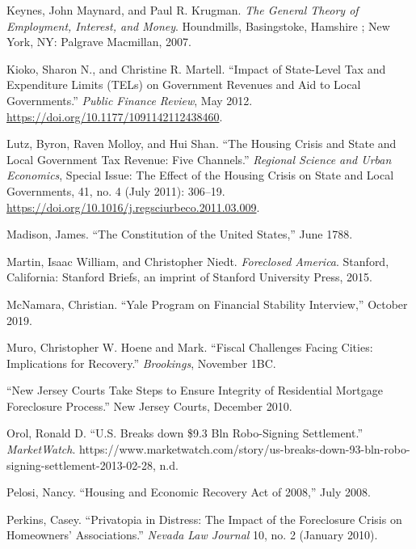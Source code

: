 \documentclass[
]{article}
\begin{document}
\leavevmode\hypertarget{ref-keynes2007general}{}%
Keynes, John Maynard, and Paul R. Krugman. \emph{The General Theory of
Employment, Interest, and Money}. Houndmills, Basingstoke, Hamshire ;
New York, NY: Palgrave Macmillan, 2007.

\leavevmode\hypertarget{ref-kioko2012impact}{}%
Kioko, Sharon N., and Christine R. Martell. ``Impact of State-Level Tax
and Expenditure Limits (TELs) on Government Revenues and Aid to Local
Governments.'' \emph{Public Finance Review}, May 2012.
\url{https://doi.org/10.1177/1091142112438460}.

\leavevmode\hypertarget{ref-lutz2011housing}{}%
Lutz, Byron, Raven Molloy, and Hui Shan. ``The Housing Crisis and State
and Local Government Tax Revenue: Five Channels.'' \emph{Regional
Science and Urban Economics}, Special Issue: The Effect of the Housing
Crisis on State and Local Governments, 41, no. 4 (July 2011): 306--19.
\url{https://doi.org/10.1016/j.regsciurbeco.2011.03.009}.

\leavevmode\hypertarget{ref-madison1788constitution}{}%
Madison, James. ``The Constitution of the United States,'' June 1788.

\leavevmode\hypertarget{ref-martinForeclosedAmerica2015}{}%
Martin, Isaac William, and Christopher Niedt. \emph{Foreclosed America}.
Stanford, California: Stanford Briefs, an imprint of Stanford University
Press, 2015.

\leavevmode\hypertarget{ref-mcnamara2019yale}{}%
McNamara, Christian. ``Yale Program on Financial Stability Interview,''
October 2019.

\leavevmode\hypertarget{ref-muro1fiscal}{}%
Muro, Christopher W. Hoene and Mark. ``Fiscal Challenges Facing Cities:
Implications for Recovery.'' \emph{Brookings}, November 1BC.

\leavevmode\hypertarget{ref-comfort2010new}{}%
``New Jersey Courts Take Steps to Ensure Integrity of Residential
Mortgage Foreclosure Process.'' New Jersey Courts, December 2010.

\leavevmode\hypertarget{ref-orolbreaks}{}%
Orol, Ronald D. ``U.S. Breaks down \$9.3 Bln Robo-Signing Settlement.''
\emph{MarketWatch}.
https://www.marketwatch.com/story/us-breaks-down-93-bln-robo-signing-settlement-2013-02-28,
n.d.

\leavevmode\hypertarget{ref-pelosiHousingEconomicRecovery2008}{}%
Pelosi, Nancy. ``Housing and Economic Recovery Act of 2008,'' July 2008.

\leavevmode\hypertarget{ref-perkins2010privatopia}{}%
Perkins, Casey. ``Privatopia in Distress: The Impact of the Foreclosure
Crisis on Homeowners' Associations.'' \emph{Nevada Law Journal} 10, no.
2 (January 2010).
\end{document}

